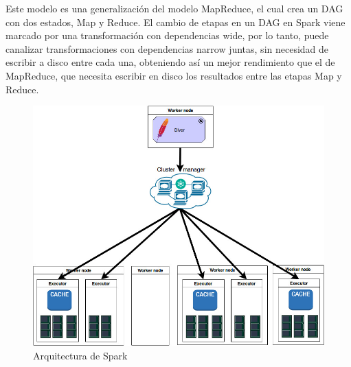 Este modelo es una generalización del modelo MapReduce, el cual crea un DAG con dos estados, Map y Reduce. El cambio de etapas en un DAG en Spark viene marcado por una transformación con dependencias wide, por lo tanto, puede canalizar transformaciones con dependencias narrow juntas, sin necesidad de escribir a disco entre cada una, obteniendo así un mejor rendimiento que el de MapReduce, que necesita escribir en disco los resultados entre las etapas Map y Reduce.\\

\begin{figure}[H]
	\includegraphics[scale=0.6]{img/arquitectura}
	\centering
	\caption{Arquitectura de Spark}
	\label{Arquitectura}
\end{figure}
